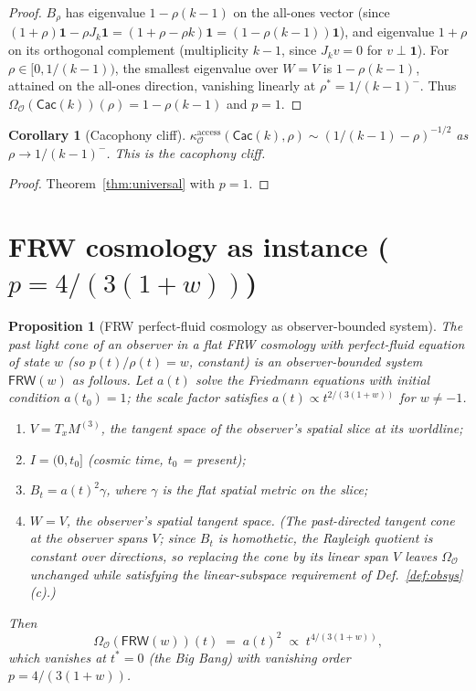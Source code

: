 \documentclass[11pt]{article}
\newtheorem{proposition}{Proposition}
\newtheorem{corollary}{Corollary}
\newcommand{\Obs}{\mathcal{O}}
\newcommand{\OmegaO}{\Omega_{\Obs}}
\newcommand{\kappaO}{\kappa_{\Obs}}
\newcommand{\Frob}{\mathsf{FRW}}
\newcommand{\Cacph}{\mathsf{Cac}}
\begin{document}
\begin{proof}
$B_\rho$ has eigenvalue $1 - \rho(k-1)$ on the all-ones vector
(since $(1+\rho)\mathbf{1} - \rho J_k \mathbf{1} = (1+\rho-\rho k)
\mathbf{1} = (1-\rho(k-1))\mathbf{1}$), and eigenvalue $1+\rho$
on its orthogonal complement (multiplicity $k-1$, since
$J_k v = 0$ for $v \perp \mathbf{1}$). For $\rho \in [0, 1/(k-1))$,
the smallest eigenvalue over $W = V$ is $1 - \rho(k-1)$, attained
on the all-ones direction, vanishing linearly at
$\rho^* = 1/(k-1)^-$. Thus $\OmegaO(\Cacph(k))(\rho) = 1 - \rho(k-1)$
and $p = 1$.
\end{proof}

\begin{corollary}[Cacophony cliff]
\label{cor:cliff}
$\kappaO^{\mathrm{access}}(\Cacph(k), \rho)
\sim (1/(k-1) - \rho)^{-1/2}$ as $\rho \to 1/(k-1)^-$. This is
the cacophony cliff.
\end{corollary}

\begin{proof}
Theorem~\ref{thm:universal} with $p = 1$.
\end{proof}

\section{FRW cosmology as instance ($p = 4/(3(1+w))$)}
\label{sec:frw}

\begin{proposition}[FRW perfect-fluid cosmology as observer-bounded system]
\label{prop:frw}
The past light cone of an observer in a flat FRW cosmology with
perfect-fluid equation of state $w$ (so $p(t)/\rho(t) = w$,
constant) is an observer-bounded system $\Frob(w)$ as follows.
Let $a(t)$ solve the Friedmann equations with initial condition
$a(t_0) = 1$; the scale factor satisfies
$a(t) \propto t^{2/(3(1+w))}$ for $w \neq -1$.
\begin{enumerate}[label=(\roman*),leftmargin=*,itemsep=2pt]
\item $V = T_x M^{(3)}$, the tangent space of the observer's
spatial slice at its worldline;
\item $I = (0, t_0]$ (cosmic time, $t_0$ = present);
\item $B_t = a(t)^2 \gamma$, where $\gamma$ is the flat spatial
metric on the slice;
\item $W = V$, the observer's spatial tangent space. (The
past-directed tangent cone at the observer spans $V$; since
$B_t$ is homothetic, the Rayleigh quotient is constant over
directions, so replacing the cone by its linear span $V$ leaves
$\OmegaO$ unchanged while satisfying the linear-subspace
requirement of Def.~\ref{def:obsys}(c).)
\end{enumerate}
Then
\[
\OmegaO(\Frob(w))(t) \;=\; a(t)^2 \;\propto\; t^{4/(3(1+w))},
\]
which vanishes at $t^* = 0$ (the Big Bang) with vanishing order
$p = 4/(3(1+w))$.
\end{proposition}
\end{document}
